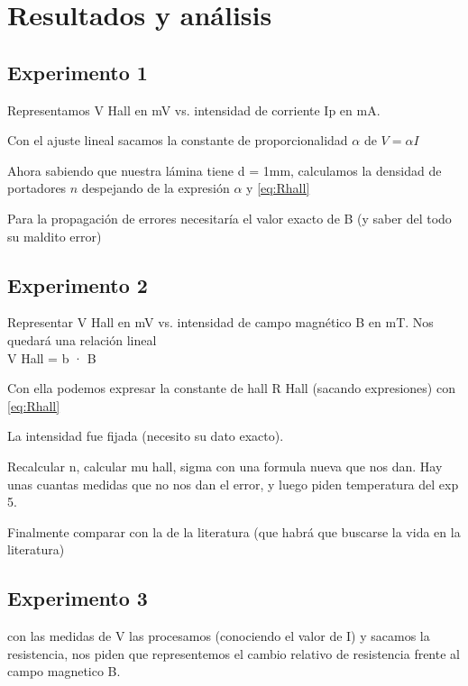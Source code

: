

\section{Resultados y análisis}

\subsection{Experimento 1}

Representamos V Hall en mV vs. intensidad de corriente Ip en mA.

Con el ajuste lineal sacamos la constante de proporcionalidad $\alpha$ de $V = \alpha I$

Ahora sabiendo que nuestra lámina tiene d = 1mm, calculamos la densidad de portadores $n$ despejando de la expresión $\alpha $ y \eqref{eq:Rhall}

Para la propagación de errores necesitaría el valor exacto de B (y saber del todo su maldito error)


\subsection{Experimento 2}

Representar V Hall en mV vs. intensidad de campo magnético B en mT.
Nos quedará una relación lineal\\
V Hall = b · B

Con ella podemos expresar la constante de hall R Hall (sacando expresiones) con \ref{eq:Rhall}

La intensidad fue fijada (necesito su dato exacto). 

Recalcular n, calcular mu hall, sigma con una formula nueva que nos dan. Hay unas cuantas medidas que no nos dan el error, y luego piden temperatura del exp 5. 

Finalmente comparar con la de la literatura (que habrá que buscarse la vida en la literatura)


\subsection{Experimento 3}

con las medidas de V las procesamos (conociendo el valor de I) y sacamos la resistencia, nos piden que representemos el cambio relativo de resistencia frente al campo magnetico B.


